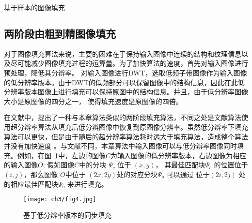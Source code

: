\begin{algorithm}[!htbp]
\LinesNumbered
{}


\label{ch3:alg:inpainting}
\caption{基于样本的图像填充}
\end{algorithm}

\subsection{两阶段由粗到精图像填充}
\label{sec:2.2}
对于图像填充算法来说，主要的困难在于保持输入图像中连续的结构和纹理信息以及尽可能减少图像填充过程的运算量。为了加快算法的速度，首先对输入图像进行预处理，降低其分辨率。 对输入图像进行DWT，选取低频子带图像作为输入图像的低分辨率版本。由于DWT的低频部分可以保留图像中的结构信息，因此在此低分辨率版本图像上进行填充可以保持原图中的结构信息。并且，由于低分辨率图像大小是原图像的四分之一， 使得填充速度是原图像的四倍。\par
在文献中，提出了一种与本章算法类似的两阶段填充算法，不同之处是文献算法使用超分辨率算法从填充后低分辨图像中恢复到原图像分辨率。虽然低分辨率下填充算法可以更快，但是由于随后的超分辨率算法耗时远大于填充算法，造成整个算法并没有加快速度 。与文献不同，本章算法中输入图像可以与低分辨率图像同时填充。例如，在图~\ref{ch3:fig:4}中，左边的图像\(C\)为输入图像的低分辨率版本，右边图像为相应的输入图像\(O\); 假如图像\(C\)中的分块 \(\Psi_c\) 位于 \((x,y)\)， 其最佳匹配块\(\Psi_{\hat{c}}\) 的位置位于 \((i, j)\)，那么图像 \(O\)中位于 \((2x, 2y)\)处的对应分块\(\Psi_o\) 可以通过 位于\((2i, 2j)\) 处的相应最佳匹配块\(\Psi_{\hat{o}}\) 来进行填充。\par
\begin{figure}[!htbp]
	\begin{center}
			\texttt{[image: ch3/fig4.jpg]}
	\end{center}
    \caption{基于低分辨率版本的同步填充}
	\label{ch3:fig:4}
\end{figure}

